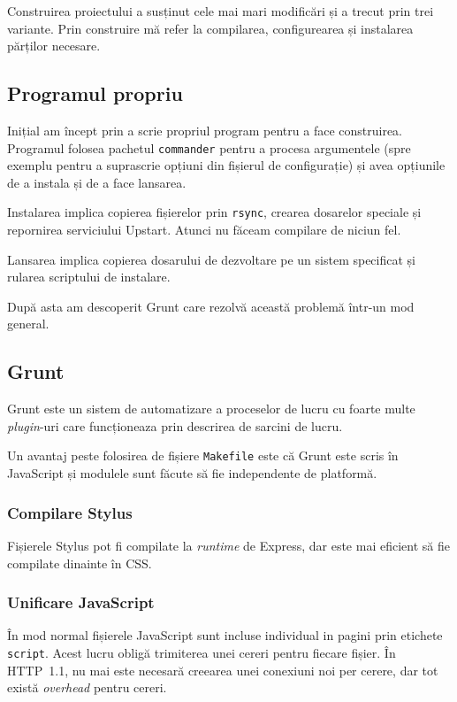 \documentclass[a4wide,12pt]{report}
\newcommand{\eng}[1]{\emph{#1}} %
\newcommand{\cod}[1]{\texttt{#1}}
\begin{document}
Construirea proiectului a susținut cele mai mari modificări și a trecut prin
trei variante. Prin construire mă refer la compilarea, configurearea și
instalarea părților necesare.

\subsection{Programul propriu}

Inițial am încept prin a scrie propriul program pentru a face construirea.
Programul folosea pachetul \cod{commander} pentru a procesa argumentele (spre
exemplu pentru a suprascrie opțiuni din fișierul de configurație) și avea
opțiunile de a instala și de a face lansarea.

Instalarea implica copierea fișierelor prin \cod{rsync}, crearea dosarelor
speciale și repornirea serviciului Upstart. Atunci nu făceam compilare de niciun
fel.

Lansarea implica copierea dosarului de dezvoltare pe un sistem specificat și
rularea scriptului de instalare.

După asta am descoperit Grunt care rezolvă această problemă într-un mod general.

\subsection{Grunt}

Grunt este un sistem de automatizare a proceselor de lucru cu foarte multe
\eng{plugin}-uri care funcționeaza prin descrirea de sarcini de lucru.

Un avantaj peste folosirea de fișiere \cod{Makefile} este că Grunt este scris în
JavaScript și modulele sunt făcute să fie independente de platformă.

\subsubsection{Compilare Stylus}

Fișierele Stylus pot fi compilate la \eng{runtime} de Express, dar este mai
eficient să fie compilate dinainte în CSS.

\subsubsection{Unificare JavaScript}

În mod normal fișierele JavaScript sunt incluse individual in pagini prin
etichete \cod{script}. Acest lucru obligă trimiterea unei cereri pentru fiecare
fișier. În HTTP~1.1, nu mai este necesară creearea unei conexiuni noi per
cerere, dar tot există \eng{overhead} pentru cereri.
\end{document}
